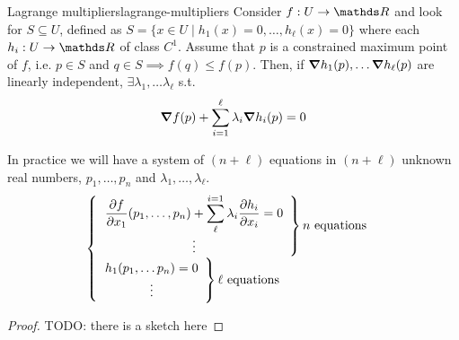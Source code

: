 \documentclass[12pt]{extarticle}
\begin{document}
\begin{theorem}{Lagrange multipliers}{lagrange-multipliers}
	Consider $f: U \to \R$ and look for $S \subseteq U$, defined
	as $S = \{ x \in U \mid h_1(x) = 0, \dots, h_\ell(x) = 0 \}$ where each $h_i : U \to \R$ of class
	$C^1$. Assume that $p$ is a constrained maximum point of $f$, i.e. $p \in S$ and
	$q \in S \implies f(q) \leq f(p)$.
	Then, if $\grad h_1(p), \dots \grad h_\ell(p)$ are linearly independent,
	$\exists \lambda_1, \dots \lambda_\ell$ s.t.
	\begin{equation}
		\grad f(p) + \sum_{i = 1}^{\ell} \lambda_i \grad h_i(p) = 0
	\end{equation}
\end{theorem}

In practice we will have a system of $(n+\ell)$ equations in $(n+\ell)$ unknown real numbers,
$p_1,\dots, p_n$ and $\lambda_1, \dots, \lambda_\ell$.
\begin{equation}
	\begin{cases}
		\left.
		\begin{array}{c}
			\displaystyle
			\pdv{f}{x_1} () (p_1, \dots, p_n) + \sum_{\ell}^{i = 1} \lambda_i \pdv{h_i}{x_i} (p_1, \dots,
			p_n) = 0 \\
			\vdots
		\end{array}
		\right\} n \text{ equations} \\
		\left.
		\begin{array}{c}
			\displaystyle
			h_1(p_1, \dots p_n) = 0 \\
			\vdots
		\end{array}
		\right\} \ell \text{ equations}
	\end{cases}
\end{equation}

\begin{proof}
	TODO: there is a sketch here
\end{proof}
\end{document}
